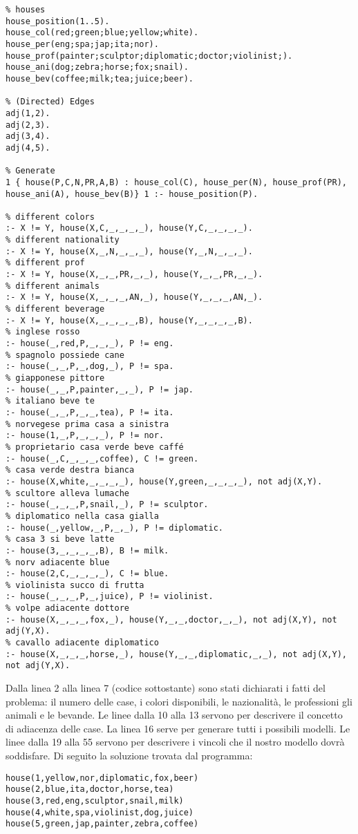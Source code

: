 \begin{lstlisting}
% houses
house_position(1..5).
house_col(red;green;blue;yellow;white).
house_per(eng;spa;jap;ita;nor).
house_prof(painter;sculptor;diplomatic;doctor;violinist;).
house_ani(dog;zebra;horse;fox;snail).
house_bev(coffee;milk;tea;juice;beer).

% (Directed) Edges
adj(1,2).
adj(2,3).
adj(3,4).
adj(4,5).

% Generate
1 { house(P,C,N,PR,A,B) : house_col(C), house_per(N), house_prof(PR), house_ani(A), house_bev(B)} 1 :- house_position(P).

% different colors
:- X != Y, house(X,C,_,_,_,_), house(Y,C,_,_,_,_).
% different nationality
:- X != Y, house(X,_,N,_,_,_), house(Y,_,N,_,_,_).
% different prof
:- X != Y, house(X,_,_,PR,_,_), house(Y,_,_,PR,_,_).
% different animals
:- X != Y, house(X,_,_,_,AN,_), house(Y,_,_,_,AN,_).
% different beverage
:- X != Y, house(X,_,_,_,_,B), house(Y,_,_,_,_,B).
% inglese rosso
:- house(_,red,P,_,_,_), P != eng.
% spagnolo possiede cane
:- house(_,_,P,_,dog,_), P != spa.
% giapponese pittore
:- house(_,_,P,painter,_,_), P != jap.
% italiano beve te
:- house(_,_,P,_,_,tea), P != ita.
% norvegese prima casa a sinistra
:- house(1,_,P,_,_,_), P != nor.
% proprietario casa verde beve caffé
:- house(_,C,_,_,_,coffee), C != green.
% casa verde destra bianca
:- house(X,white,_,_,_,_), house(Y,green,_,_,_,_), not adj(X,Y).
% scultore alleva lumache
:- house(_,_,_,P,snail,_), P != sculptor.
% diplomatico nella casa gialla
:- house(_,yellow,_,P,_,_), P != diplomatic.
% casa 3 si beve latte
:- house(3,_,_,_,_,B), B != milk.
% norv adiacente blue
:- house(2,C,_,_,_,_), C != blue.
% violinista succo di frutta
:- house(_,_,_,P,_,juice), P != violinist.
% volpe adiacente dottore
:- house(X,_,_,_,fox,_), house(Y,_,_,doctor,_,_), not adj(X,Y), not adj(Y,X).
% cavallo adiacente diplomatico
:- house(X,_,_,_,horse,_), house(Y,_,_,diplomatic,_,_), not adj(X,Y), not adj(Y,X).
\end{lstlisting}
Dalla linea 2 alla linea 7 (codice sottostante) sono stati dichiarati i fatti del problema: il numero delle case, i colori disponibili, le nazionalità, le professioni
gli animali e le bevande. Le linee dalla 10 alla 13 servono per descrivere il concetto di adiacenza delle case. La linea 16 serve per generare tutti i possibili modelli. Le linee dalla 19 alla 55 servono per descrivere i vincoli che il nostro modello dovrà soddisfare.
Di seguito la soluzione trovata dal programma:
\begin{lstlisting}
house(1,yellow,nor,diplomatic,fox,beer) 
house(2,blue,ita,doctor,horse,tea) 
house(3,red,eng,sculptor,snail,milk) 
house(4,white,spa,violinist,dog,juice) 
house(5,green,jap,painter,zebra,coffee)
\end{lstlisting}